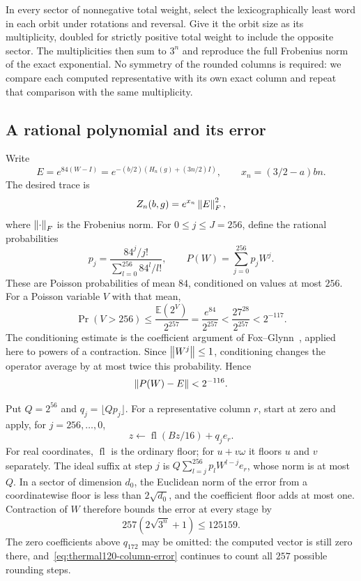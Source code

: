 In every sector of nonnegative total weight, select the lexicographically
least word in
each orbit under rotations and reversal.  Give it the orbit size as its
multiplicity, doubled for strictly positive total weight to include the
opposite sector.  The multiplicities then sum to $3^n$ and reproduce the
full Frobenius norm of the exact exponential.  No symmetry of the rounded
columns is required: we compare each computed representative with its
own exact column and repeat that comparison with the same multiplicity.

\subsection{A rational polynomial and its error}

Write
\[
 E=e^{84(W-I)}=e^{-(b/2)(H_n(g)+(3n/2)I)},
 \qquad x_n=(3/2-a)bn.
\]
The desired trace is
\begin{equation}\label{eq:thermal120-frobenius}
 Z_n(b,g)=e^{x_n}\left\lVert E\right\rVert_F^2,
\end{equation}
where $\left\lVert \cdot\right\rVert_F$ is the Frobenius norm.
For $0\le j\le J=256$, define the rational probabilities
\begin{equation}\label{eq:thermal120-probabilities}
 p_j=\frac{84^j/j!}{\sum_{l=0}^{256}84^l/l!},
 \qquad P(W)=\sum_{j=0}^{256}p_jW^j.
\end{equation}
These are Poisson probabilities of mean $84$, conditioned on values at
most $256$.  For a Poisson variable $V$ with that mean,
\[
 \Pr(V>256)\le\frac{\mathbb E(2^V)}{2^{257}}
 =\frac{e^{84}}{2^{257}}
 <\frac{27^{28}}{2^{257}}<2^{-117}.
\]
The conditioning estimate is the coefficient argument of
Fox--Glynn~\cite[Proposition~1]{FoxGlynn1988}, applied here to powers
of a contraction. Since $\left\lVert W^j\right\rVert\le1$, conditioning changes the operator average by at
most twice this probability.  Hence
\begin{equation}\label{eq:thermal120-poisson-error}
 \left\lVert P(W)-E\right\rVert<2^{-116}.
\end{equation}

Put $Q=2^{56}$ and $q_j=\lfloor Qp_j\rfloor$.  For a representative
column $r$, start at zero and apply, for $j=256,\ldots,0$,
\begin{equation}\label{eq:thermal120-horner}
 z\longleftarrow\operatorname{fl}(Bz/16)+q_j e_r.
\end{equation}
For real coordinates, $\operatorname{fl}$ is the ordinary floor; for
$u+v\omega$ it floors $u$ and $v$ separately.
The ideal suffix at step $j$ is
$Q\sum_{l=j}^{256}p_lW^{l-j}e_r$, whose norm is at most $Q$.
In a sector of dimension $d_0$, the Euclidean norm of the error from a
coordinatewise floor is less than $2\sqrt{d_0}$, and the coefficient floor adds at most
one.  Contraction of $W$ therefore bounds the error at every stage by
\begin{equation}\label{eq:thermal120-column-error}
 257(2\sqrt{3^n}+1)\le125159.
\end{equation}
The zero coefficients above $q_{172}$ may be omitted: the computed
vector is still zero there, and~\eqref{eq:thermal120-column-error}
continues to count all $257$ possible rounding steps.

